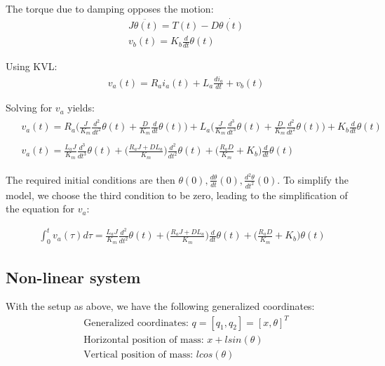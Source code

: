 \documentclass [12pt,letterpaper]{exam}
\begin{document}
The torque due to damping opposes the motion:
\begin{align}
& J\ddot{\theta(t)} = T(t) - D\dot{\theta(t)} \\
& v_b(t) = K_b\frac{d}{dt}\theta(t)
\end{align}

Using KVL:
\begin{align}
& v_a(t) = R_ai_a(t) + L_a\frac{di_a}{dt} + v_b(t)
\end{align}

Solving for $v_a$ yields:
\begin{align}
\begin{split}
& v_a(t) = R_a\bigg(\frac{J}{K_m}\frac{d^2}{dt^2}\theta(t) + \frac{D}{K_m}\frac{d}{dt}\theta(t)\bigg) + L_a\bigg(\frac{J}{K_m}\frac{d^3}{dt^3}\theta(t) + \frac{D}{K_m}\frac{d^2}{dt^2}\theta(t)\bigg) + K_b\frac{d}{dt}\theta(t) \end{split} \\
\begin{split}
& v_a(t) = \frac{L_aJ}{K_m}\frac{d^3}{dt^3}\theta(t) + \bigg(\frac{R_aJ + DL_a}{K_m}\bigg)\frac{d^2}{dt^2}\theta(t) + \bigg(\frac{R_aD}{K_m} + K_b\bigg)\frac{d}{dt}\theta(t)
\end{split}
\end{align}

The required initial conditions are then $\theta(0), \frac{d\theta}{dt}(0), \frac{d^2\theta}{dt^2}(0)$. To simplify the model, we choose the third condition to be zero, leading to the simplification of the equation for $v_a$:

\begin{align}
\int_{0}^{t} v_a(\tau) d\tau = \frac{L_aJ}{K_m}\frac{d^2}{dt^2}\theta(t) + \bigg(\frac{R_aJ + DL_a}{K_m}\bigg)\frac{d}{dt}\theta(t) + \bigg(\frac{R_aD}{K_m} + K_b\bigg)\theta(t)
\end{align}

\subsection{Non-linear system}
With the setup as above, we have the following generalized coordinates:
\begin{align}
& \mbox{Generalized coordinates: } q = [q_1, q_2] = [x, \theta]^T \\
& \mbox{Horizontal position of mass: } x + lsin(\theta) \\
& \mbox{Vertical position of mass: } lcos(\theta)
\end{align}
\end{document}

